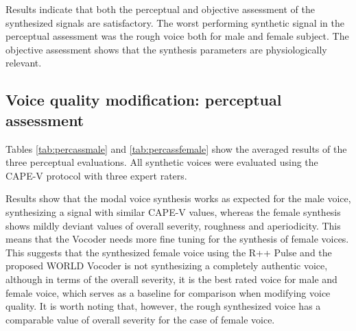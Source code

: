 \documentclass[final,5p,times,twocolumn]{elsarticle}
\begin{document}
Results indicate that both the perceptual and objective assessment of the synthesized signals are satisfactory. The worst performing synthetic signal in the perceptual assessment was the rough voice both for male and female subject. The objective assessment shows that the synthesis parameters are physiologically relevant.

\subsection{Voice quality modification: perceptual assessment}

Tables \ref{tab:percassmale} and \ref{tab:percassfemale} show the averaged results of the three perceptual evaluations. All synthetic voices were evaluated using the CAPE-V protocol with three expert raters.

Results show that the modal voice synthesis works as expected for the male voice, synthesizing a signal with similar CAPE-V values, whereas the female synthesis shows mildly deviant values of overall severity, roughness and aperiodicity. This means that the Vocoder needs more fine tuning for the synthesis of female voices. This suggests that the synthesized female voice using the R++ Pulse and the proposed WORLD Vocoder is not synthesizing a completely authentic voice, although in terms of the overall severity, it is the best rated voice for male and female voice, which serves as a baseline for comparison when modifying voice quality. It is worth noting that, however, the rough synthesized voice has a comparable value of overall severity for the case of female voice.
\end{document}

